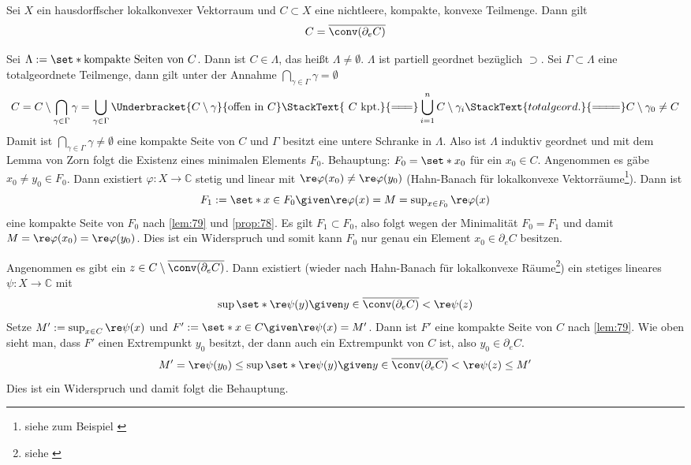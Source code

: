 \begin{satz}[{name={{Krein-Milman}}},label=satz:krein_milman]
	Sei $X$ ein hausdorffscher lokalkonvexer Vektorraum und $C \subset X$ eine nichtleere, kompakte, konvexe Teilmenge.
	Dann gilt 
	\[
		C=\overline{\conv(\partial_e C)}
	\]
\end{satz}
\begin{beweis}
	Sei $\Lambda := \set*{\text{kompakte Seiten von }C}$.
	Dann ist $C \in \Lambda$, das heißt $\Lambda \neq \emptyset$.
	$\Lambda$ ist partiell geordnet bezüglich $\supset$.
	Sei $\Gamma \subset \Lambda$ eine totalgeordnete Teilmenge, dann gilt unter der Annahme $\bigcap_{\gamma \in \Gamma} \gamma =\emptyset$
	\[
		C= C \setminus \bigcap_{\gamma \in \Gamma} \gamma = \bigcup_{\gamma \in \Gamma} \Underbracket{C \setminus \gamma}{\text{offen in }C}\StackText{\,\,C \text{ kpt.} }{=\joinrel=\joinrel=} 
		\bigcup_{i=1}^n C \setminus \gamma_i \StackText{totalgeord.}{=\joinrel=\joinrel=\joinrel=} C \setminus \gamma_0 \neq C
	\]
	Damit ist $\bigcap_{\gamma \in \Gamma} \gamma \neq \emptyset$ eine kompakte Seite von $C$ und $\Gamma$ besitzt eine untere Schranke in $\Lambda$.
	Also ist $\Lambda$ induktiv geordnet und mit dem Lemma von Zorn folgt die Existenz eines minimalen Elements $F_0$.
	Behauptung: $F_0= \set*{x_0}$ für ein $x_0 \in C$.
	Angenommen es gäbe $x_0 \neq y_0 \in F_0$. 
	Dann existiert $\varphi \colon X \to \mathbb{C}$ stetig und linear mit $\re \varphi(x_0) \neq \re \varphi(y_0)$ (Hahn-Banach für lokalkonvexe Vektorräume\footnote{siehe zum Beispiel \cite[Cor. A.9, S. 271]{Murphy}}).
	Dann ist 
	\[
		F_1 :=  \set*{x \in F_0 \given \re \varphi(x)=M=\sup\nolimits_{x \in F_0} \re \varphi(x)}
	\]
	eine kompakte Seite von $F_0$ nach \autoref{lem:79} und \autoref{prop:78}.
	Es gilt $F_1 \subset F_0$, also folgt wegen der Minimalität $F_0=F_1$ und damit $M= \re \varphi(x_0) = \re \varphi(y_0)$.
	Dies ist ein Widerspruch und somit kann $F_0$ nur genau ein Element $x_0 \in \partial_e C$ besitzen.
	
	Angenommen es gibt ein $z \in C \setminus \overline{\conv(\partial_e C)}$.
	Dann existiert (wieder nach Hahn-Banach für lokalkonvexe Räume\footnote{siehe \cite[Th. A.7, S. 270]{Murphy}}) ein stetiges lineares $\psi \colon X \to \mathbb{C}$ mit 
	\[
		\sup\set*{\re \psi(y) \given y \in \overline{\conv(\partial_e C)}} < \re \psi(z)
	\]
	Setze $M' := \sup_{x \in C} \re \psi(x)$ und $F':= \set*{x \in C \given \re \psi(x) =M'}$.
	Dann ist $F'$ eine kompakte Seite von $C$ nach \autoref{lem:79}.
	Wie oben sieht man, dass $F'$ einen Extrempunkt $y_0$ besitzt, der dann auch ein Extrempunkt von $C$ ist, also $y_0 \in \partial_e C$.
	\[
		M' = \re \psi(y_0) \le \sup \set*{\re \psi(y) \given y \in \overline{\conv(\partial_e C)}} < \re \psi(z) \le M'
	\]
	Dies ist ein Widerspruch und damit folgt die Behauptung.
\end{beweis}

